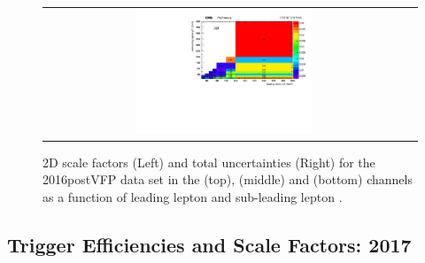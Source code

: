 {\begin{figure}[h]
\begin{center}
\begin{tabular}{cc}
      \includegraphics[width=0.50\textwidth]{fig_2016postVFP_TrigSF/h2D_lepABpt_mumu_BinErrors.pdf}\\
    \end{tabular}
    \caption{2D scale factors (Left) and total uncertainties (Right) for the 2016postVFP data set in the \emu (top), \ee (middle) and \mumu (bottom) channels as a function of leading lepton \pT and sub-leading lepton \pT.}
    \label{TrigSF_2016postVFP_4}
  \end{center}
\end{figure}

\clearpage
\subsection{Trigger Efficiencies and Scale Factors: 2017}
\label{TrigSFResults2017}

}
